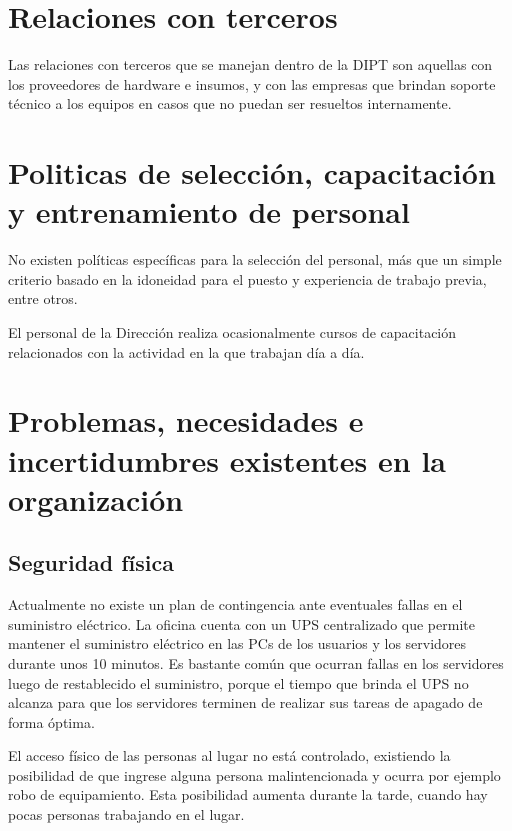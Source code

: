 \documentclass[a4paper,11pt,oneside]{article}
\begin{document}
\section{Relaciones con terceros}
Las relaciones con terceros que se manejan dentro de la DIPT son
aquellas con los proveedores de hardware e insumos, y con las empresas
que brindan soporte técnico a los equipos en casos que no puedan ser
resueltos internamente.
%
\section{Politicas de selección, capacitación y entrenamiento de personal}
%
No existen políticas específicas para la selección del personal, más
que un simple criterio basado en la idoneidad para el puesto y
experiencia de trabajo previa, entre otros.

El personal de la Dirección realiza ocasionalmente cursos de
capacitación relacionados con la actividad en la que trabajan día a
día.
%
\section{Problemas, necesidades e incertidumbres existentes en la organización}
%





\subsection*{Seguridad física}
Actualmente no existe un plan de contingencia ante eventuales fallas
en el suministro eléctrico. La oficina cuenta con un UPS centralizado
que permite mantener el suministro eléctrico en las PCs de los
usuarios y los servidores durante unos 10 minutos. Es bastante común
que ocurran fallas en los servidores luego de restablecido el
suministro, porque el tiempo que brinda el UPS no alcanza para que los servidores 
terminen de realizar sus tareas de apagado de forma óptima.

El acceso físico de las personas al lugar no está controlado, existiendo la
posibilidad de que ingrese alguna persona malintencionada y ocurra por
ejemplo robo de equipamiento. Esta posibilidad aumenta durante la
tarde, cuando hay pocas personas trabajando en el lugar.
\end{document}
